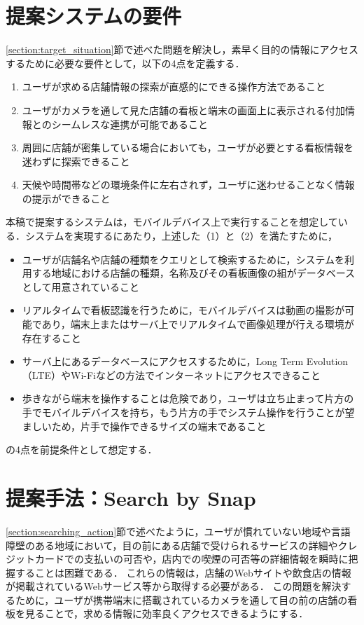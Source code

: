 \section{提案システムの要件}
  \label{subsection:requirement}
  \ref{section:target_situation}節で述べた問題を解決し，素早く目的の情報にアクセスするために必要な要件として，以下の4点を定義する．
  \begin{enumerate}
    \item ユーザが求める店舗情報の探索が直感的にできる操作方法であること
    \item ユーザがカメラを通して見た店舗の看板と端末の画面上に表示される付加情報とのシームレスな連携が可能であること
    \item 周囲に店舗が密集している場合においても，ユーザが必要とする看板情報を迷わずに探索できること
    \item 天候や時間帯などの環境条件に左右されず，ユーザに迷わせることなく情報の提示ができること
  \end{enumerate}
  本稿で提案するシステムは，モバイルデバイス上で実行することを想定している．システムを実現するにあたり，上述した（1）と（2）を満たすために，
  \begin{itemize}
    \item ユーザが店舗名や店舗の種類をクエリとして検索するために，システムを利用する地域における店舗の種類，名称及びその看板画像の組がデータベースとして用意されていること
    \item リアルタイムで看板認識を行うために，モバイルデバイスは動画の撮影が可能であり，端末上またはサーバ上でリアルタイムで画像処理が行える環境が存在すること
    \item サーバ上にあるデータベースにアクセスするために，Long Term Evolution（LTE）やWi-Fiなどの方法でインターネットにアクセスできること
    \item 歩きながら端末を操作することは危険であり，ユーザは立ち止まって片方の手でモバイルデバイスを持ち，もう片方の手でシステム操作を行うことが望ましいため，片手で操作できるサイズの端末であること
  \end{itemize}
  の4点を前提条件として想定する．

\section{提案手法：Search by Snap}
\label{section:design_sbs}
  \ref{section:searching_action}節で述べたように，ユーザが慣れていない地域や言語障壁のある地域において，目の前にある店舗で受けられるサービスの詳細やクレジットカードでの支払いの可否や，店内での喫煙の可否等の詳細情報を瞬時に把握することは困難である．
  これらの情報は，店舗のWebサイトや飲食店の情報が掲載されているWebサービス等から取得する必要がある．
  この問題を解決するために，ユーザが携帯端末に搭載されているカメラを通して目の前の店舗の看板を見ることで，求める情報に効率良くアクセスできるようにする．
  
